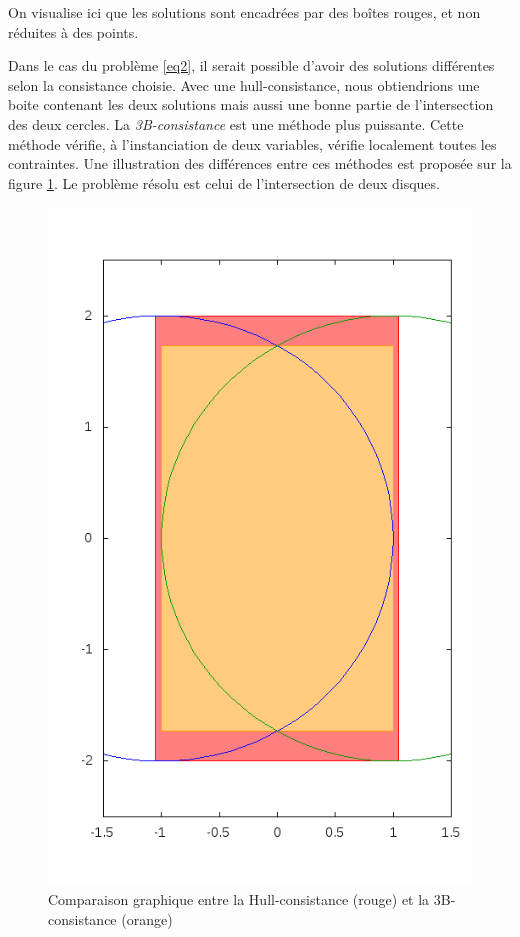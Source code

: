 On visualise ici que les solutions sont encadrées par des \og boîtes \fg{} rouges, et non réduites à des points. 

Dans le cas du problème \ref{eq2}, il serait possible d'avoir des solutions différentes selon la consistance choisie. Avec une hull-consistance, nous obtiendrions une boite contenant les deux solutions mais aussi une bonne partie de l'intersection des deux cercles. La \emph{3B-consistance} est une méthode plus puissante. Cette méthode vérifie, à l'instanciation de deux variables, vérifie localement toutes les contraintes. Une illustration des différences entre ces méthodes est proposée sur la figure \ref{fig:3Bconst}. Le problème résolu est celui de l'intersection de deux disques.
\begin{figure}[ht!] %
  \center
\includegraphics[scale=0.35]{img/disk-disk2}
  \caption{Comparaison graphique entre la Hull-consistance (rouge) et la 3B-consistance (orange)} %
 \label{fig:3Bconst} %
\end{figure} %


